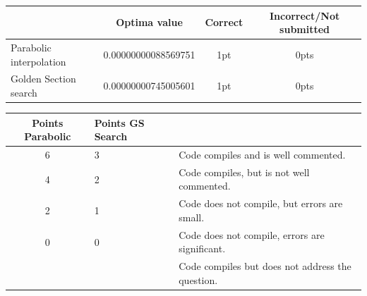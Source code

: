 \documentclass[11pt]{article}
\begin{document}
\begin{enumerate}[(a)]
	\begin{table}[H]
		\centering
		\color{red}
		\begin{tabular}{| l | c | c | c |}
			\hline
			& Optima value &  Correct & Incorrect/Not submitted\\
			\hline
			Parabolic interpolation  & 0.00000000088569751 & 1pt & 0pts\\
			\hline
			Golden Section search    & 0.00000000745005601 & 1pt & 0pts\\
			\hline
		\end{tabular}
		\begin{table}[H]
		\centering
		\color{red}
		\begin{tabular}{| c | l | l |}
			\hline
			Points Parabolic & Points GS Search &\\
			\hline
			6 & 3 & Code compiles and is well commented. \\
			\hline
			4 & 2 & Code compiles, but is not well commented. \\
			\hline
			2 &  1 & Code does not compile, but errors are small. \\
			\hline
			0 & 0 & Code does not compile, errors are significant. \\
			& & Code compiles but does not address the question.\\
			\hline
		\end{tabular}
	\end{table}
	\end{table}
	
\end{enumerate}
\end{document}
